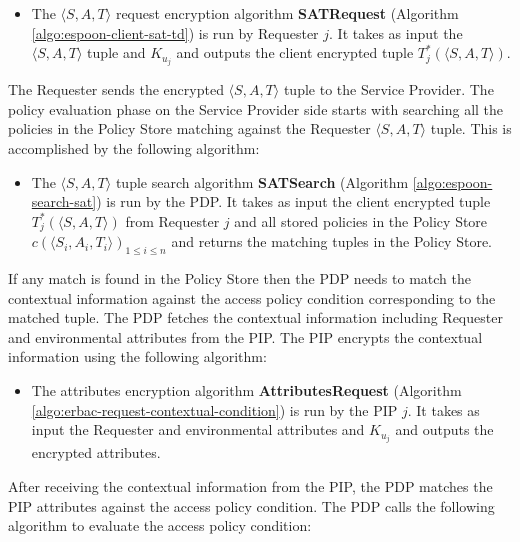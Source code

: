 \documentclass[epsfig,a4paper,11pt,titlepage]{book}
\numberwithin{algorithm}{chapter}
\begin{document}
\begin{itemize}

\item The $\langle S, A, T \rangle$ request encryption algorithm \textbf{SATRequest} (Algorithm \ref{algo:espoon-client-sat-td}) is run by Requester $j$. It takes as input the $\langle S, A, T \rangle$ tuple and $K_{u_j}$ and outputs the client encrypted tuple $T^*_j (\langle S, A, T \rangle)$.

\end{itemize}

The Requester sends the encrypted $\langle S, A, T \rangle$ tuple to the Service Provider. The policy evaluation phase on the Service Provider side starts with searching all the policies in the Policy Store matching against the Requester $\langle S, A, T \rangle$ tuple. This is accomplished by the following algorithm:

\begin{itemize}

\item The $\langle S, A, T \rangle$ tuple search algorithm \textbf{SATSearch} (Algorithm \ref{algo:espoon-search-sat}) is run by the \gls{PDP}. It takes as input the client encrypted tuple $T^*_j (\langle S, A, T \rangle)$ from Requester $j$ and all stored policies in the Policy Store $c(\langle S_i, A_i, T_i \rangle)_{1 \leq i \leq n}$ and returns the matching tuples in the Policy Store.

\end{itemize}

If any match is found in the Policy Store then the \gls{PDP} needs to match the contextual information against the access policy condition corresponding to the matched tuple. The \gls{PDP} fetches the contextual information including Requester and environmental attributes from the \gls{PIP}. The \gls{PIP} encrypts the contextual information using the following algorithm:

\begin{itemize}

\item The attributes encryption algorithm \textbf{AttributesRequest} (Algorithm \ref{algo:erbac-request-contextual-condition}) is run by the \gls{PIP} $j$. It takes as input the Requester and environmental attributes and $K_{u_j}$ and outputs the encrypted attributes.

\end{itemize}

After receiving the contextual information from the \gls{PIP}, the \gls{PDP} matches the \gls{PIP} attributes against the access policy condition. The \gls{PDP} calls the following algorithm to evaluate the access policy condition:
\end{document}
